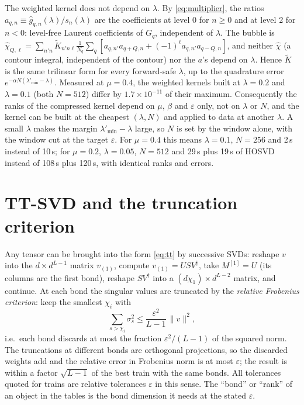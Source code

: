 \documentclass[aps,prb,reprint,a4paper]{revtex4-2}
\begin{document}
\label{sec:lambda_indep}%
The weighted kernel does not depend on $\lambda$. By \eqref{eq:multiplier}, the ratios $a_{q,n}\equiv\hat g_{q,n}(\lambda)/s_n(\lambda)$ are the coefficients at level 0 for $n\ge0$ and at level 2 for $n<0$: level-free Laurent coefficients of $G_q$, independent of $\lambda$. The bubble is $\hat\chi_{Q,\ell}=\sum_{n'n}\widetilde K_{n'n\ell}\frac1{N_q}\sum_q[a_{q,n'}a_{q+Q,n}+(-1)^\ell a_{q,n'}a_{q-Q,n}]$, and neither $\hat\chi$ (a contour integral, independent of the contour) nor the $a$'s depend on $\lambda$. Hence $\widetilde K$ is the same trilinear form for every forward-safe $\lambda$, up to the quadrature error $e^{-\alpha N(\lambda'_{\min}-\lambda)}$. Measured at $\mu=0.4$, the weighted kernels built at $\lambda=0.2$ and $\lambda=0.1$ (both $N=512$) differ by $1.7\times10^{-11}$ of their maximum. Consequently the ranks of the compressed kernel depend on $\mu$, $\beta$ and $\varepsilon$ only, not on $\lambda$ or $N$, and the kernel can be built at the cheapest $(\lambda,N)$ and applied to data at another $\lambda$. A small $\lambda$ makes the margin $\lambda'_{\min}-\lambda$ large, so $N$ is set by the window alone, with the window cut at the target $\varepsilon$. For $\mu=0.4$ this means $\lambda=0.1$, $N=256$ and 2\,s instead of 10\,s; for $\mu=0.2$, $\lambda=0.05$, $N=512$ and 29\,s plus 19\,s of HOSVD instead of 108\,s plus 120\,s, with identical ranks and errors.

\section{TT-SVD and the truncation criterion}
\label{app:ttsvd}

Any tensor can be brought into the form \eqref{eq:tt} by successive SVDs: reshape $v$ into the $d\times d^{L-1}$ matrix $v_{(1)}$, compute $v_{(1)}=USV^\dagger$, take $M^{[1]}=U$ (its columns are the first bond), reshape $SV^\dagger$ into a $(d\chi_1)\times d^{L-2}$ matrix, and continue. At each bond the singular values are truncated by the \emph{relative Frobenius criterion}: keep the smallest $\chi_i$ with
\begin{equation}
  \sum_{s>\chi_i}\sigma_s^2\le\frac{\varepsilon^2}{L-1}\,\lVert v\rVert^2,
  \label{eq:trunc}
\end{equation}
i.e.\ each bond discards at most the fraction $\varepsilon^2/(L-1)$ of the squared norm. The truncations at different bonds are orthogonal projections, so the discarded weights add and the relative error in Frobenius norm is at most $\varepsilon$; the result is within a factor $\sqrt{L-1}$ of the best train with the same bonds. All tolerances quoted for trains are relative tolerances $\varepsilon$ in this sense. The ``bond'' or ``rank'' of an object in the tables is the bond dimension it needs at the stated $\varepsilon$.
\end{document}
